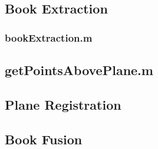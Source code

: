 \subsection{Book Extraction}\label{BookExtractionCode}

\subsubsection{bookExtraction.m}\label{bookExtractionCode}


\subsection{getPointsAbovePlane.m}\label{getPointsAbovePlane}




\subsection{Plane Registration} \label{PlaneRegistrationCode}



\subsection{Book Fusion}
%